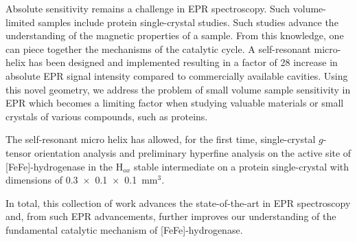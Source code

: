 Absolute sensitivity remains a challenge in EPR spectroscopy. Such volume-limited samples include protein single-crystal studies. Such studies advance the understanding of the magnetic properties of a sample. From this knowledge, one can piece together the mechanisms of the catalytic cycle. A self-resonant micro-helix has been designed and implemented resulting in a factor of 28 increase in absolute EPR signal intensity compared to commercially available cavities. Using this novel geometry, we address the problem of small volume sample sensitivity in EPR which becomes a limiting factor when studying valuable materials or small crystals of various compounds, such as proteins. 

The self-resonant micro helix has allowed, for the first time, single-crystal $g$-tensor orientation analysis and preliminary hyperfine analysis on the active site of [FeFe]-hydrogenase in the H$_{ox}$ stable intermediate on a protein single-crystal with dimensions of 0.3~$\times$~0.1~$\times$~0.1~mm$^3$. 

In total, this collection of work advances the state-of-the-art in EPR spectroscopy and, from such EPR advancements, further improves our understanding of the fundamental catalytic mechanism of [FeFe]-hydrogenase. 


{\renewcommand{\bibsection}{\clearpage\section*{\bibname}\markboth{\bibname}{\bibname}}
\renewcommand{\bibname}{CHAPTER 1. REFERENCES}


}